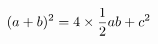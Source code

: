 \documentclass[preview]{standalone}
\begin{document}
\begin{align*}
\special{dvisvgm:raw <g id='unique000'>}(a+b)^2 = 4 \times \frac{1}{2}ab + c^2\special{dvisvgm:raw </g>}
\end{align*}
\end{document}
